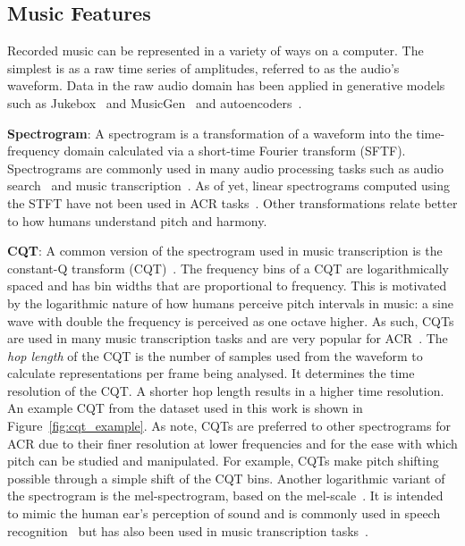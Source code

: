 \subsection{Music Features}\label{sec:background-features}

Recorded music can be represented in a variety of ways on a computer. The simplest is as a raw time series of amplitudes, referred to as the audio's waveform. Data in the raw audio domain has been applied in generative models such as Jukebox~\citep{Jukebox} and MusicGen~\citep{MusicGen} and autoencoders~\citep{Encodec}.

\textbf{Spectrogram}: A spectrogram is a transformation of a waveform into the time-frequency domain calculated via a short-time Fourier transform (SFTF). Spectrograms are commonly used in many audio processing tasks such as audio search~\citep{ShazamSpectrogram} and music transcription~\citep{PianoTranscriptionWithTransformer}. As of yet, linear spectrograms computed using the STFT have not been used in ACR tasks~\citep{20YearsofACR}. Other transformations relate better to how humans understand pitch and harmony.

\textbf{CQT}: A common version of the spectrogram used in music transcription is the constant-Q transform (CQT)~\citep{CQT}. The frequency bins of a CQT are logarithmically spaced and has bin widths that are proportional to frequency. This is motivated by the logarithmic nature of how humans perceive pitch intervals in music: a sine wave with double the frequency is perceived as one octave higher. As such, CQTs are used in many music transcription tasks and are very popular for ACR~\citep{FirstDeepLearningCQT,StructuredTraining}. The \emph{hop length} of the CQT is the number of samples used from the waveform to calculate representations per frame being analysed. It determines the time resolution of the CQT. A shorter hop length results in a higher time resolution. An example CQT from the dataset used in this work is shown in Figure~\ref{fig:cqt_example}. As \citet{SaliencyChroma} note, CQTs are preferred to other spectrograms for ACR due to their finer resolution at lower frequencies and for the ease with which pitch can be studied and manipulated. For example, CQTs make pitch shifting possible through a simple shift of the CQT bins. Another logarithmic variant of the spectrogram is the mel-spectrogram, based on the mel-scale~\citep{MelScale}. It is intended to mimic the human ear's perception of sound and is commonly used in speech recognition~\citep{SpeechProcessingMels} but has also been used in music transcription tasks~\citep{MelodyTranscriptionViaGenerativePreTraining}.

